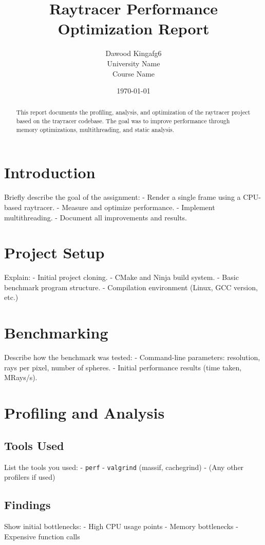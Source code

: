 \documentclass{article}
\title{Raytracer Performance Optimization Report}
\author{Dawood Kingafg6 \\ University Name \\ Course Name}
\date{\today}
\begin{document}
\maketitle

\begin{abstract}
This report documents the profiling, analysis, and optimization of the raytracer project based on the trayracer codebase. The goal was to improve performance through memory optimizations, multithreading, and static analysis.
\end{abstract}

\tableofcontents
\newpage

\section{Introduction}
Briefly describe the goal of the assignment:
- Render a single frame using a CPU-based raytracer.
- Measure and optimize performance.
- Implement multithreading.
- Document all improvements and results.

\section{Project Setup}
Explain:
- Initial project cloning.
- CMake and Ninja build system.
- Basic benchmark program structure.
- Compilation environment (Linux, GCC version, etc.)

\section{Benchmarking}
Describe how the benchmark was tested:
- Command-line parameters: resolution, rays per pixel, number of spheres.
- Initial performance results (time taken, MRays/s).

\section{Profiling and Analysis}
\subsection{Tools Used}
List the tools you used:
- \texttt{perf}
- \texttt{valgrind} (massif, cachegrind)
- (Any other profilers if used)

\subsection{Findings}
Show initial bottlenecks:
- High CPU usage points
- Memory bottlenecks
- Expensive function calls
\end{document}
